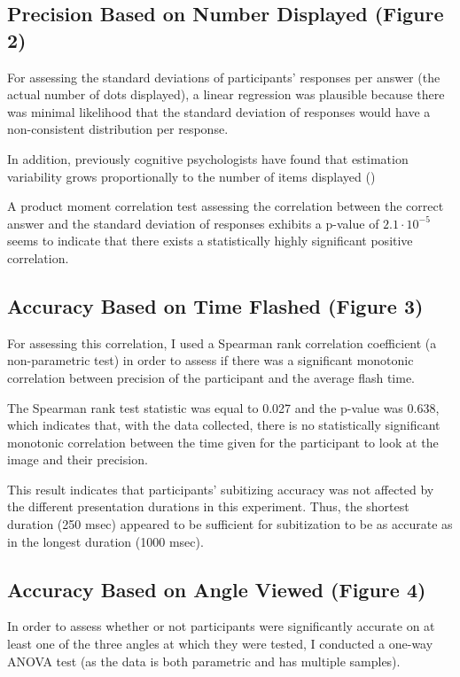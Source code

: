 \documentclass[12pt]{article}
\begin{document}
\subsection{Precision Based on Number Displayed (Figure 2)}

For assessing the standard deviations of participants' responses per answer
(the actual number of dots displayed), a linear regression was plausible
because there was minimal likelihood that the standard deviation of responses
would have a non-consistent distribution per response.

In addition, previously cognitive psychologists have found that estimation
variability grows proportionally to the number of items displayed (\cite{prop})

A product moment correlation test assessing the correlation between the correct
answer and the standard deviation of responses exhibits a p-value of $2.1 \cdot
10^{-5}$ seems to indicate that there exists a statistically highly significant
positive correlation.

\subsection{Accuracy Based on Time Flashed (Figure 3)}

For assessing this correlation, I used a Spearman rank correlation coefficient
(a non-parametric test) in order to assess if there was a significant monotonic
correlation between precision of the participant and the average flash time.

The Spearman rank test statistic was equal to 0.027 and the p-value was 0.638,
which indicates that, with the data collected, there is no statistically
significant monotonic correlation between the time given for the
participant to look at the image and their precision.

This result indicates that participants’ subitizing accuracy was not affected
by the different presentation durations in this experiment. Thus, the shortest
duration (250 msec) appeared to be sufficient for subitization to be as
accurate as in the longest duration (1000 msec).

\subsection{Accuracy Based on Angle Viewed (Figure 4)}

In order to assess whether or not participants were significantly accurate on
at least one of the three angles at which they were tested, I conducted
a one-way ANOVA test (as the data is both parametric and has multiple samples).
\end{document}
